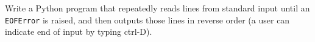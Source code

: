  \label{sssec:ex1_21}

Write a Python program that repeatedly reads lines from standard input until an \texttt{EOFError} is raised, and then outputs those lines in reverse order (a user can indicate end of input by typing ctrl-D).


